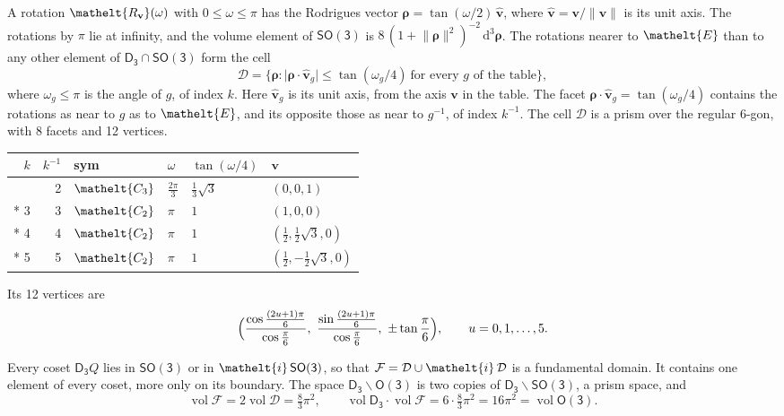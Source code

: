 \documentclass[10pt,a4paper]{article}
\numberwithin{equation}{section}
\newcommand{\eltfont}[1]{{\let\sigma\eltsigma\mathelt{#1}}}
\newcommand{\grp}[1]{\mathsf{#1}}
\newcommand{\cls}[1]{\eltfont{#1}}
\newcommand{\elt}[1]{\eltfont{#1}}
\newcommand{\dirvec}[3]{(#1, #2, #3)}
\newcommand{\unitaxis}{\hat{\mathbf{v}}}
\newcommand{\vv}{\mathbf{v}}
\newcommand{\diff}{\mathrm{d}}
\newcommand{\vol}{\operatorname{vol}}
\newcommand{\rodrigues}{\boldsymbol{\rho}}
\newcommand{\fcell}{\mathcal{D}}
\newcommand{\fdomain}{\mathcal{F}}
\begin{document}
\leavevmode\label{n:vector.rodrigues}\label{n:vector.unitaxis}A rotation $\elt{R_{\vv}}(\omega)$ with $0 \le \omega \le \pi$ has the Rodrigues vector $\rodrigues = \tan(\omega/2)\,\unitaxis$, where $\unitaxis = \vv/\lVert\vv\rVert$ is its unit axis. The rotations by $\pi$ lie at infinity, and the volume element of \href{SO3.pdf}{$\grp{SO(3)}$} is $8\,(1 + \lVert\rodrigues\rVert^2)^{-2}\,\diff^3\rodrigues$.
\leavevmode\label{n:set.cell}The rotations nearer to $\elt{E}$ than to any other element of $\grp{D_{3}} \cap \grp{SO(3)}$ form the cell
\begin{equation}\label{e:cell}\fcell = \bigl\{\rodrigues : \lvert\rodrigues\cdot\unitaxis_g\rvert \le \tan(\omega_g/4)\ \text{for every $g$ of the table}\bigr\},\end{equation}
where $\omega_g \le \pi$ is the angle of $g$, of index $k$. Here $\unitaxis_g$ is its unit axis, from the axis $\vv$ in the table. The facet $\rodrigues\cdot\unitaxis_g = \tan(\omega_g/4)$ contains the rotations as near to $g$ as to $\elt{E}$, and its opposite those as near to $g^{-1}$, of index $k^{-1}$. The cell $\fcell$ is a prism over the regular 6-gon, with 8 facets and 12 vertices.
{\small{\renewcommand{\arraystretch}{1.3}\begin{longtable}{@{}rrllll@{}}\toprule
$k$ & $k^{-1}$ & sym & $\omega$ & $\tan(\omega/4)$ & $\vv$\\\midrule\endhead
\bottomrule\endfoot\endlastfoot
1 & 2 & $\cls{C_{3}}$ & $\tfrac{2\pi}{3}$ & $\tfrac{1}{3}\sqrt{3}$ & $\dirvec{0}{0}{1}$\\*
3 & 3 & $\cls{C_{2}}$ & $\pi$ & $1$ & $\dirvec{1}{0}{0}$\\*
4 & 4 & $\cls{C_{2}}$ & $\pi$ & $1$ & $\dirvec{\tfrac{1}{2}}{\tfrac{1}{2}\sqrt{3}}{0}$\\*
5 & 5 & $\cls{C_{2}}$ & $\pi$ & $1$ & $\dirvec{\tfrac{1}{2}}{-\tfrac{1}{2}\sqrt{3}}{0}$\\
\bottomrule\end{longtable}}}
\leavevmode\label{n:local.vertex.u}Its 12 vertices are
\begin{equation}\label{e:prism}\Bigl(\frac{\cos\frac{(2u+1)\pi}{6}}{\cos\frac{\pi}{6}},\ \frac{\sin\frac{(2u+1)\pi}{6}}{\cos\frac{\pi}{6}},\ \pm\tan\frac{\pi}{6}\Bigr),\qquad u = 0, 1, \dots, 5.\end{equation}

\leavevmode\label{n:set.fundamental}Every coset $\grp{D_{3}}Q$ lies in \href{SO3.pdf}{$\grp{SO(3)}$} or in $\elt{i}\,\grp{SO(3)}$, so that $\fdomain = \fcell \cup \elt{i}\,\fcell$ is a fundamental domain. It contains one element of every coset, more only on its boundary.
The space $\grp{D_{3}}\backslash\grp{O(3)}$ is two copies of $\grp{D_{3}}\backslash\grp{SO(3)}$, a prism space, and
\begin{equation}\label{e:volume}\vol\fdomain = 2\vol\fcell = \tfrac{8}{3}\pi^2,\qquad \vol\grp{D_{3}}\cdot\vol\fdomain = 6\cdot \tfrac{8}{3}\pi^2 = 16\pi^2 = \vol\grp{O(3)}.\end{equation}
\end{document}

